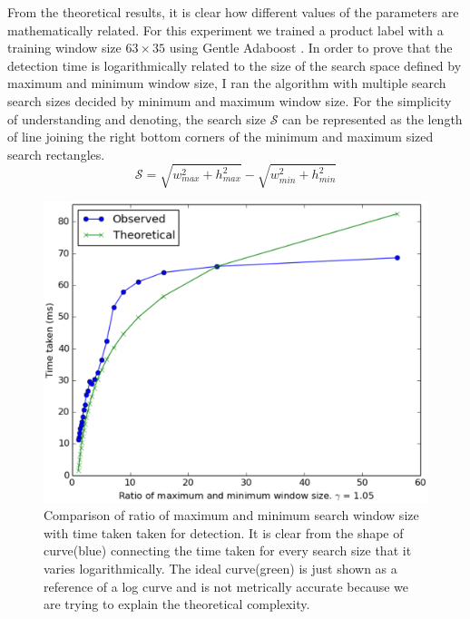 From the theoretical results, it is clear how different values of the parameters are mathematically related. For this experiment we trained a product label with a training window size $63 \times 35$ using Gentle Adaboost \cite{classifier6,classifier7}.  In order to prove that the detection time is logarithmically related to the size of the search space defined by maximum and minimum window size, I ran the algorithm with multiple search search sizes decided by minimum and maximum window size. For the simplicity of understanding and denoting, the search size $\mathcal{S}$ can be represented as the length of line joining the right bottom corners of the minimum and maximum sized search rectangles.
\begin{equation}
\mathcal{S} = \sqrt{w_{max}^2 + h_{max}^2} - \sqrt{w_{min}^2 + h_{min}^2}
\label{eq12}
\end{equation}

\begin{figure}[h]
    \centering
    \includegraphics[width=\textwidth]{Appendices/figures1/winSize_vs_time}
    \caption{Comparison of ratio of maximum and minimum search window size with time taken taken for detection. It is clear from the shape of curve(blue) connecting the time taken for every search size that it varies logarithmically. The ideal curve(green) is just shown as a reference of a log curve and is not metrically accurate because we are trying to explain the theoretical complexity.}
    \label{one}
\end{figure}

